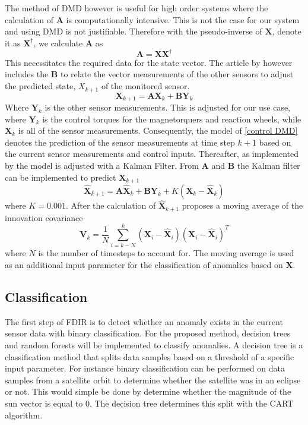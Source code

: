 \documentclass[letterpaper, 10 pt, conference]{ieeeconf}  %
\begin{document}
The method of DMD however is useful for high order systems where the calculation of $\mathbf{A}$ is computationally intensive. This is not the case for our system and using DMD is not justifiable. Therefore with the pseudo-inverse of $\mathbf{X}$, denote it as $\mathbf{X^{\dagger}}$, we calculate $\mathbf{A}$ as
\begin{equation}
	\mathbf{A} = \mathbf{X}\mathbf{X^{\dagger}}
\end{equation}
This necessitates the required data for the state vector. The article by \textcite{DeSilva2020} however includes the $\mathbf{B}$ to relate the vector measurements of the other sensors to adjust the predicted state, $X_{k+1}$ of the monitored sensor. 
\begin{equation}
	\mathbf{X}_{k+1} = \mathbf{AX}_k + \mathbf{BY}_k
	\label{control DMD}
\end{equation}
Where $\mathbf{Y}_k$ is the other sensor measurements. This is adjusted for our use case, where $\mathbf{Y}_k$ is the control torques for the magnetorquers and reaction wheels, while $\mathbf{X}_k$ is all of the sensor measurements. Consequently, the model of \ref{control DMD} denotes the prediction of the sensor measurements at time step $k+1$ based on the current sensor measurements and control inputs.
Thereafter, as implemented by \textcite{DeSilva2020} the model is adjusted with a Kalman Filter. From $\mathbf{A}$ and $\mathbf{B}$ the Kalman filter can be implemented to predict $\mathbf{X}_{k+1}$
\begin{equation}
	\hat{\mathbf{X}}_{k+1} = \mathbf{A}\hat{\mathbf{X}}_k + \mathbf{B}\mathbf{Y}_k + K(\mathbf{X}_k - \hat{\mathbf{X}}_k)
\end{equation}
where $K = 0.001$. After the calculation of $\hat{\mathbf{X}}_{k+1}$ \textcite{DeSilva2020} proposes a moving average of the innovation covariance
\begin{equation}
	\mathbf{V}_k = \frac{1}{N} \sum_{i=k-N}^k (\mathbf{X}_i - \hat{\mathbf{X}}_i)(\mathbf{X}_i - \hat{\mathbf{X}}_i)^T
\end{equation}
where $N$ is the number of timesteps to account for. The moving average is used as an additional input parameter for the classification of anomalies based on $\mathbf{X}$.

\subsection{Classification}
The first step of FDIR is to detect whether an anomaly exists in the current sensor data with binary classification. For the proposed method, decision trees and random forests will be implemented to classify anomalies. A decision tree is a classification method that splits data samples based on a threshold of a specific input parameter. For instance binary classification can be performed on data samples from a satellite orbit to determine whether the satellite was in an eclipse or not. This would simple be done by determine whether the magnitude of the sun vector is equal to $0$. The decision tree determines this split with the CART algorithm.
\end{document}
